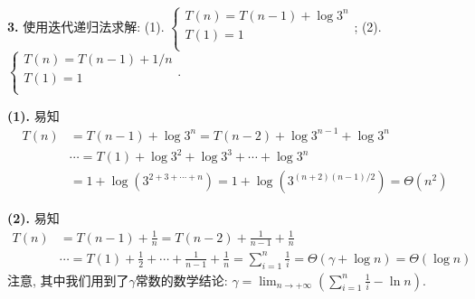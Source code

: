 \documentclass{article}
\begin{document}
\begin{homeworkProblem}
	\textbf{3.} 使用迭代递归法求解: (1). $\begin{cases}
		T\left( n \right) =T\left( n-1 \right) +\log 3^n\\
		T\left( 1 \right) =1\\
	\end{cases}$;  (2). $\begin{cases}
		T\left( n \right) =T\left( n-1 \right) +1/n\\
		T\left( 1 \right) =1\\
	\end{cases}$.

	\solution

	\textbf{(1).} 易知
	\begin{align}
		T\left( n \right) &=T\left( n-1 \right) +\log 3^n=T\left( n-2 \right) +\log 3^{n-1}+\log 3^n
		\\
		&\cdots =T\left( 1 \right) +\log 3^2+\log 3^3+\cdots +\log 3^n
		\\
		&=1+\log \left( 3^{2+3+\cdots +n} \right) =1+\log \left( 3^{\left( n+2 \right) \left( n-1 \right) /2} \right) = \Theta \left(n^2\right)
	\end{align}

	\textbf{(2).} 易知
	\begin{align}
		T\left( n \right) &=T\left( n-1 \right) +\frac{1}{n}=T\left( n-2 \right) +\frac{1}{n-1}+\frac{1}{n}
		\\
		&\cdots =T\left( 1 \right) +\frac{1}{2}+\cdots +\frac{1}{n-1}+\frac{1}{n}=\sum_{i=1}^n{\frac{1}{i}}=\Theta \left( \gamma +\log n \right) =\Theta \left( \log n \right) 
	\end{align}
	注意, 其中我们用到了$\gamma$常数的数学结论: $\displaystyle \gamma = \lim_{n\to +\infty}\left(\sum_{i=1}^{n}\frac{1}{i}-\ln n\right)$.
\end{homeworkProblem}



\end{document}
